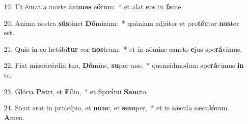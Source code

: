 19. Ut éruat a morte áni\textbf{mas} e\textbf{ó}rum:~*  et alat \textbf{e}os in \textbf{fa}me.\

20. Anima nostra \textbf{sús}tinet \textbf{Dó}minum:~*  quóniam adjútor et pro\textbf{téc}tor \textbf{nos}ter est.\

21. Quia in eo lætábi\textbf{tur} cor \textbf{nos}trum:~*  et in nómine sancto \textbf{e}jus spe\textbf{rá}vimus.\

22. Fiat misericórdia tua, \textbf{Dó}mine, \textbf{su}per nos:~*  quemádmodum spe\textbf{rá}vimus \textbf{in} te.\

23. Glória \textbf{Pa}tri, et \textbf{Fí}lio,~*  et Spi\textbf{rí}tui \textbf{Sanc}to.\

24. Sicut erat in princípio, et \textbf{nunc}, et \textbf{sem}per,~*  et in sǽcula sæcu\textbf{ló}rum. \textbf{A}men.\

